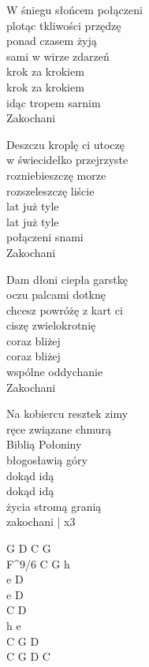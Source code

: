 \begin{textn}
    W śniegu słońcem połączeni\\
    plotąc tkliwości przędzę\\
    ponad czasem żyją\\
    sami w wirze zdarzeń\\
    krok za krokiem\\
    krok za krokiem\\
    idąc tropem sarnim\\
    Zakochani

    Deszczu kroplę ci utoczę\\
    w świecidełko przejrzyste\\
    rozniebieszczę morze\\
    rozszeleszczę liście\\
    lat już tyle\\
    lat już tyle\\
    połączeni snami\\
    Zakochani

    Dam dłoni ciepła garstkę\\
    oczu palcami dotknę\\
    chcesz powróżę z kart ci\\
    ciszę zwielokrotnię\\
    coraz bliżej\\
    coraz bliżej\\
    wspólne oddychanie\\
    Zakochani

    Na kobiercu resztek zimy\\
    ręce związane chmurą\\
    Biblią Połoniny\\
    błogosławią góry\\
    dokąd idą\\
    dokąd idą\\
    życia stromą granią\\
    zakochani | x3
\end{textn}
\begin{chordw}
    G D C G\\
    F^{9/6} C G h\\
    e D\\
    e D\\
    C D\\
    h e\\
    C G D\\
    C G D C
\end{chordw}